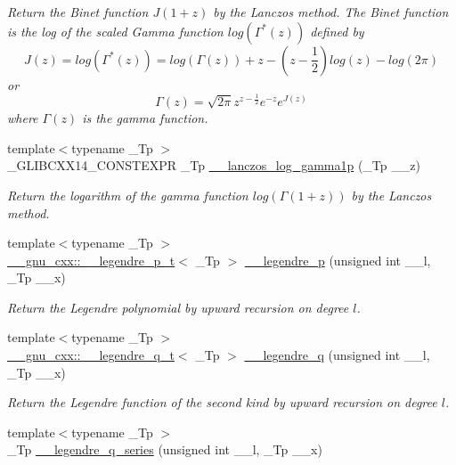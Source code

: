 \begin{DoxyCompactItemize}
\begin{DoxyCompactList}\small\item\em Return the Binet function $ J(1+z) $ by the Lanczos method. The Binet function is the log of the scaled Gamma function $ log(\Gamma^*(z)) $ defined by \[ J(z) = log(\Gamma^*(z)) = log\left(\Gamma(z)\right) + z - \left(z-\frac{1}{2}\right) log(z) - log(2\pi) \] or \[ \Gamma(z) = \sqrt{2\pi}z^{z-\frac{1}{2}}e^{-z}e^{J(z)} \] where $ \Gamma(z) $ is the gamma function. \end{DoxyCompactList}\item 
{\footnotesize template$<$typename \+\_\+\+Tp $>$ }\\\+\_\+\+G\+L\+I\+B\+C\+X\+X14\+\_\+\+C\+O\+N\+S\+T\+E\+X\+PR \+\_\+\+Tp \hyperlink{namespacestd_1_1____detail_a4586aeea80ba556ab8d6393dadb05c5c}{\+\_\+\+\_\+lanczos\+\_\+log\+\_\+gamma1p} (\+\_\+\+Tp \+\_\+\+\_\+z)
\begin{DoxyCompactList}\small\item\em Return the logarithm of the gamma function $ log(\Gamma(1+z)) $ by the Lanczos method. \end{DoxyCompactList}\item 
{\footnotesize template$<$typename \+\_\+\+Tp $>$ }\\\hyperlink{struct____gnu__cxx_1_1____legendre__p__t}{\+\_\+\+\_\+gnu\+\_\+cxx\+::\+\_\+\+\_\+legendre\+\_\+p\+\_\+t}$<$ \+\_\+\+Tp $>$ \hyperlink{namespacestd_1_1____detail_ab06b50bbac9758b5a2cc7d3d8213daa9}{\+\_\+\+\_\+legendre\+\_\+p} (unsigned int \+\_\+\+\_\+l, \+\_\+\+Tp \+\_\+\+\_\+x)
\begin{DoxyCompactList}\small\item\em Return the Legendre polynomial by upward recursion on degree $ l $. \end{DoxyCompactList}\item 
{\footnotesize template$<$typename \+\_\+\+Tp $>$ }\\\hyperlink{struct____gnu__cxx_1_1____legendre__q__t}{\+\_\+\+\_\+gnu\+\_\+cxx\+::\+\_\+\+\_\+legendre\+\_\+q\+\_\+t}$<$ \+\_\+\+Tp $>$ \hyperlink{namespacestd_1_1____detail_aa3260951fa25185d757b65145fb1d3c9}{\+\_\+\+\_\+legendre\+\_\+q} (unsigned int \+\_\+\+\_\+l, \+\_\+\+Tp \+\_\+\+\_\+x)
\begin{DoxyCompactList}\small\item\em Return the Legendre function of the second kind by upward recursion on degree $ l $. \end{DoxyCompactList}\item 
{\footnotesize template$<$typename \+\_\+\+Tp $>$ }\\\+\_\+\+Tp \hyperlink{namespacestd_1_1____detail_a8a1a46e206545e8c7d3cae2a508833aa}{\+\_\+\+\_\+legendre\+\_\+q\+\_\+series} (unsigned int \+\_\+\+\_\+l, \+\_\+\+Tp \+\_\+\+\_\+x)

\end{DoxyCompactItemize}
